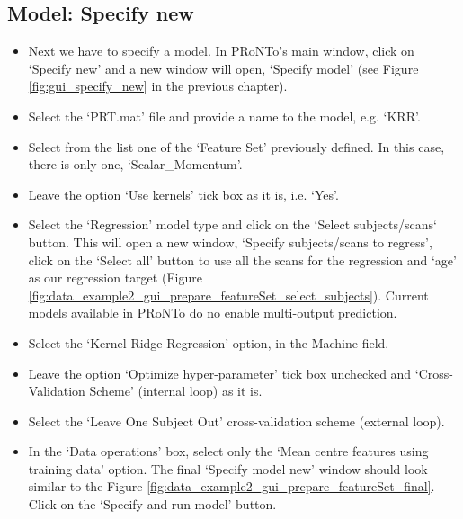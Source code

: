 \subsection{Model: Specify new}
\begin{itemize}

    \item Next we have to specify a model. In PRoNTo's main window, click on `Specify new' and a new window will open, `Specify model' (see Figure \ref{fig:gui_specify_new} in the previous chapter).

   	\item Select the `PRT.mat' file and provide a name to the model, e.g. `KRR'.

    \item Select from the list one of the `Feature Set' previously defined. In this case, there is only one, `Scalar\_Momentum'.

	\item	Leave the option `Use kernels' tick box as it is, i.e. `Yes'.
	
	\item Select the `Regression' model type and click on the `Select subjects/scans` button. This will open a new window, `Specify subjects/scans to regress', click on the `Select all' button to use all the scans for the regression and `age' as our regression target (Figure \ref{fig:data_example2_gui_prepare_featureSet_select_subjects}). Current models available in PRoNTo do no enable multi-output prediction.
	
     \item Select the `Kernel Ridge Regression' option, in the Machine field.
     
	 \item Leave the option `Optimize hyper-parameter' tick box unchecked and `Cross-Validation Scheme' (internal loop) as it is. 
	
	\item Select the `Leave One Subject Out' cross-validation scheme (external loop).
	
	\item In the `Data operations' box, select only the `Mean centre features using training data' option. The final `Specify model new' window should look similar to the Figure \ref{fig:data_example2_gui_prepare_featureSet_final}. Click on the `Specify and run model' button.
	



\end{itemize}
